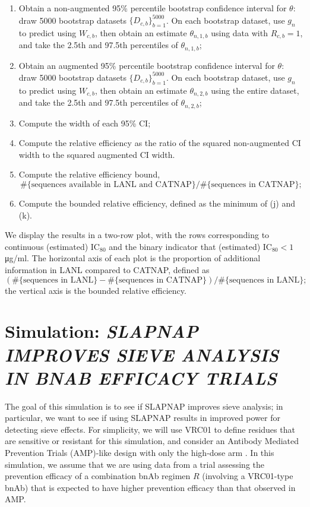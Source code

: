 \documentclass[10pt]{article}
\begin{document}
\begin{enumerate}
\begin{enumerate}
    \item Obtain a non-augmented 95\% percentile bootstrap confidence interval for $\theta$: draw 5000 bootstrap datasets $\{D_{c,b}\}_{b = 1}^{5000}$. On each bootstrap dataset, use $g_n$ to predict using $W_{c,b}$, then obtain an estimate $\theta_{n,1,b}$ using data with $R_{c,b} = 1$, and take the 2.5th and 97.5th percentiles of $\theta_{n,1,b}$;
    \item Obtain an augmented 95\% percentile bootstrap confidence interval for $\theta$: draw 5000 bootstrap datasets $\{D_{c,b}\}_{b = 1}^{5000}$. On each bootstrap dataset, use $g_n$ to predict using $W_{c,b}$, then obtain an estimate $\theta_{n,2,b}$ using the entire dataset, and take the 2.5th and 97.5th percentiles of $\theta_{n,2,b}$;
    \item Compute the width of each 95\% CI;
    \item Compute the relative efficiency as the ratio of the squared non-augmented CI width to the squared augmented CI width.
    \item Compute the relative efficiency bound, $$\#\{\text{sequences available in LANL and CATNAP}\} / \#\{\text{sequences in CATNAP}\};$$
    \item Compute the bounded relative efficiency, defined as the minimum of (j) and (k).
  \end{enumerate}
\end{enumerate}
We display the results in a two-row plot, with the rows corresponding to continuous (estimated) IC$_{80}$ and the binary indicator that (estimated) IC$_{80} < 1$ \si{\ug}/ml. The horizontal axis of each plot is the proportion of additional information in LANL compared to CATNAP, defined as $$(\#\{\text{sequences in LANL}\} - \#\{\text{sequences in CATNAP}\}) / \#\{\text{sequences in LANL}\};$$ the vertical axis is the bounded relative efficiency.

\section*{Simulation: \textit{SLAPNAP IMPROVES SIEVE ANALYSIS IN BNAB EFFICACY TRIALS}}

The goal of this simulation is to see if SLAPNAP improves sieve analysis; in particular, we want to see if using SLAPNAP results in improved power for detecting sieve effects. For simplicity, we will use VRC01 to define residues that are sensitive or resistant for this simulation, and consider an Antibody Mediated Prevention Trials (AMP)-like design with only the high-dose arm \citep{corey2021}. In this simulation, we assume that we are using data from a trial assessing the prevention efficacy of a combination bnAb regimen $R$ (involving a VRC01-type bnAb) that is expected to have higher prevention efficacy than that observed in AMP.
\end{document}
